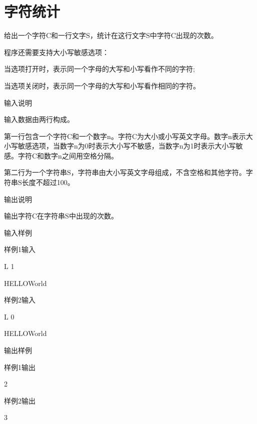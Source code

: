 \section{字符统计}
给出一个字符C和一行文字S，统计在这行文字S中字符C出现的次数。

程序还需要支持大小写敏感选项：

当选项打开时，表示同一个字母的大写和小写看作不同的字符;

当选项关闭时，表示同一个字母的大写和小写看作相同的字符。

输入说明	

输入数据由两行构成。

第一行包含一个字符C和一个数字n。字符C为大小或小写英文字母。数字n表示大小写敏感选项，当数字n为0时表示大小写不敏感，当数字n为1时表示大小写敏感。字符C和数字n之间用空格分隔。

第二行为一个字符串S，字符串由大小写英文字母组成，不含空格和其他字符。字符串S长度不超过100。

输出说明
	
输出字符C在字符串S中出现的次数。

输入样例

样例1输入

L 1

HELLOWorld

样例2输入

L 0

HELLOWorld

输出样例

样例1输出	

2

样例2输出

3

